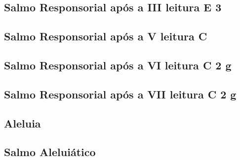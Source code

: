 
\subsection{Salmo Responsorial após a III leitura \textmd{E 3}}\label{subsection:hebdomada-sancta/ad-vigiliam-paschalem-in-nocte-sancta/psalmus-responsorius-1}

\AllowPageFlush

\subsection{Salmo Responsorial após a V leitura \textmd{C \protect\GreStar}}\label{subsection:hebdomada-sancta/ad-vigiliam-paschalem-in-nocte-sancta/psalmus-responsorius-2}

\subsection{Salmo Responsorial após a VI leitura \textmd{C 2 g}}\label{subsection:hebdomada-sancta/ad-vigiliam-paschalem-in-nocte-sancta/psalmus-responsorius-3}

\AllowPageFlush

\subsection{Salmo Responsorial após a VII leitura \textmd{C 2 g}}\label{subsection:hebdomada-sancta/ad-vigiliam-paschalem-in-nocte-sancta/psalmus-responsorius-4}

\AllowPageFlush

\subsection{Aleluia}\label{subsection:hebdomada-sancta/ad-vigiliam-paschalem-in-nocte-sancta/alleluia}

\subsection{Salmo Aleluiático}\label{subsection:hebdomada-sancta/ad-vigiliam-paschalem-in-nocte-sancta/psalmus-alleluiaticus}

